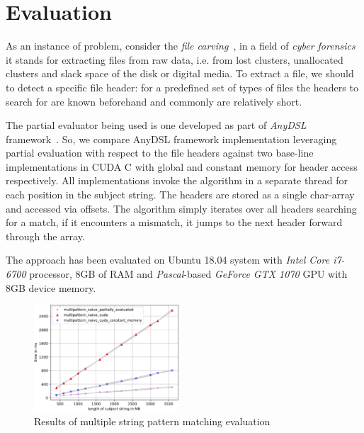 \documentclass[sigplan,review,anonymous]{acmart}\settopmatter{printfolios=true,printccs=false,printacmref=false}
\newcommand\todo[1]{{\color{red}#1}}
\begin{document}




\section{Evaluation}

As an instance of problem, consider the \textit{file carving}~\cite{DataCarving}, in a field of \textit{cyber forensics} it stands for extracting files from raw data, i.e. from lost clusters, unallocated clusters and slack space of the disk or digital media.
To extract a file, we should to detect a specific file header: for a predefined set of types of files the headers to search for are known beforehand and commonly are relatively short.

The partial evaluator being used is one developed as part of \textit{AnyDSL} framework~\cite{LeiBa}.
So, we compare AnyDSL framework implementation leveraging partial evaluation with respect to the file headers against two base-line implementations in CUDA C with global and constant memory for header access respectively. 
All implementations invoke the algorithm in a separate thread for each position in the subject string.
The headers are stored as a single char-array and accessed via offsets.
The algorithm simply iterates over all headers searching for a match, if it encounters a mismatch, it jumps to the next header forward through the array.


The approach has been evaluated on Ubuntu 18.04 system with \textit{Intel Core i7-6700} processor, 8GB of RAM and \textit{Pascal}-based \textit{GeForce GTX 1070} GPU with 8GB device memory.

\begin{figure}[t]
\centering
    \includegraphics[width=0.48\textwidth]{results.pdf}
    \caption{Results of multiple string pattern matching evaluation}
    \label{fig:eval}
\end{figure}
\end{document}
